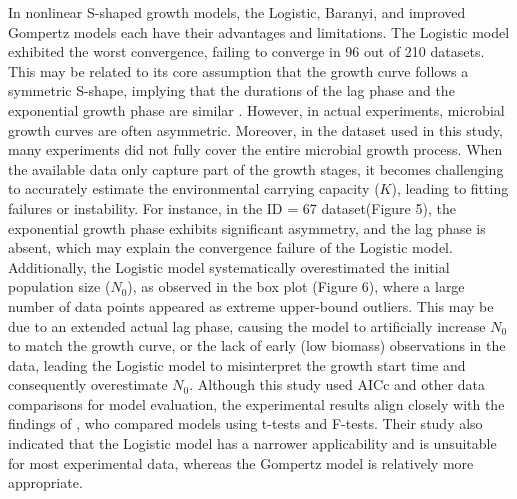 \documentclass[12pt]{article}
\begin{document}
In nonlinear S-shaped growth models, the Logistic, Baranyi, and improved Gompertz models each have their advantages and limitations. The Logistic model exhibited the worst convergence, failing to converge in 96 out of 210 datasets. This may be related to its core assumption that the growth curve follows a symmetric S-shape, implying that the durations of the lag phase and the exponential growth phase are similar \citep{LoGrasso2023}. However, in actual experiments, microbial growth curves are often asymmetric. Moreover, in the dataset used in this study, many experiments did not fully cover the entire microbial growth process. When the available data only capture part of the growth stages, it becomes challenging to accurately estimate the environmental carrying capacity ($K$), leading to fitting failures or instability. For instance, in the ID = 67 dataset(Figure 5), the exponential growth phase exhibits significant asymmetry, and the lag phase is absent, which may explain the convergence failure of the Logistic model. Additionally, the Logistic model systematically overestimated the initial population size ($N_0$), as observed in the box plot (Figure 6), where a large number of data points appeared as extreme upper-bound outliers. This may be due to an extended actual lag phase, causing the model to artificially increase $N_0$ to match the growth curve, or the lack of early (low biomass) observations in the data, leading the Logistic model to misinterpret the growth start time and consequently overestimate $N_0$. Although this study used AICc and other data comparisons for model evaluation, the experimental results align closely with the findings of \citet{Zwietering1990}, who compared models using t-tests and F-tests. Their study also indicated that the Logistic model has a narrower applicability and is unsuitable for most experimental data, whereas the Gompertz model is relatively more appropriate.
\end{document}

